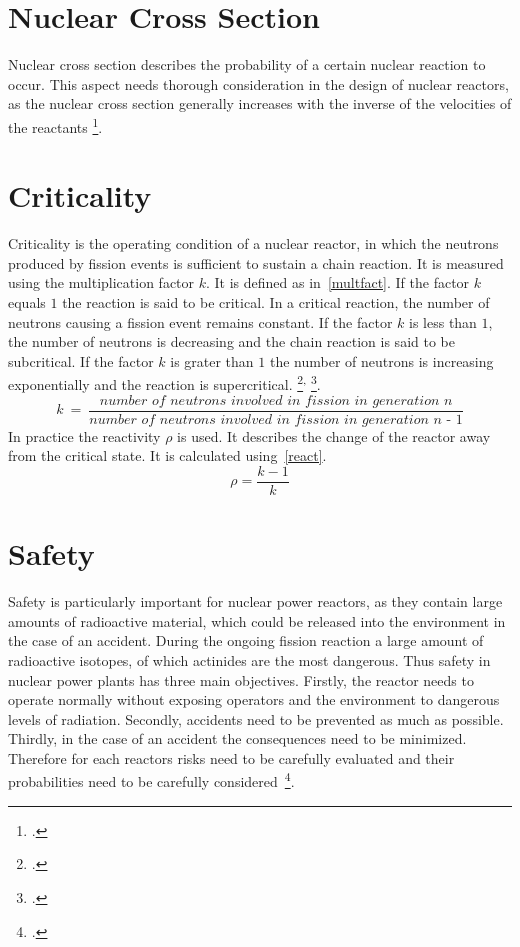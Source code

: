 \section{Nuclear Cross Section}
Nuclear cross section describes the probability of a certain nuclear reaction to occur. This
aspect needs thorough consideration in the design of nuclear reactors, as the nuclear cross section
generally increases with the inverse of the velocities of the reactants \footcite[108]{nucfundamentals}.

\section{Criticality}
Criticality is the operating condition of a nuclear reactor, in which the neutrons produced by fission
events is sufficient to sustain a chain reaction. It is measured using the multiplication factor
$k$. It is defined as in~\ref{multfact}. If the factor $k$ equals $1$ the reaction is said to be
critical. In a critical reaction, the number of neutrons causing a fission event remains constant. 
If the factor $k$ is less than $1$, the number of neutrons is decreasing and the chain reaction is said to be subcritical. If the factor
$k$ is grater than $1$ the number of neutrons is increasing exponentially and the reaction is supercritical.
\footcite[308]{nucfundamentals}\textsuperscript{,} \footcite[39]{ReactorPhysics}.
\begin{equation}
    \label{multfact}
    k~=~\frac{\textit{number of neutrons involved in fission in generation n}}{\textit{number of neutrons involved in fission in generation n - 1}}
\end{equation}
In practice the reactivity $\rho$ is used. It describes the change of the reactor away from the critical
state. It is calculated using~\ref{react}.
\begin{equation}
    \label{react}
    \rho = \frac{k-1}{k}
\end{equation}

\section{Safety}
Safety is particularly important for nuclear power reactors, as they contain large amounts of radioactive
material, which could be released into the environment in the case of an accident. During the ongoing
fission reaction a large amount of radioactive isotopes, of which actinides are the most dangerous.
Thus safety in nuclear power plants has three main objectives. Firstly, the reactor needs to operate normally
without exposing operators and the environment to dangerous levels of radiation. Secondly, accidents need
to be prevented as much as possible. Thirdly, in the case of an accident the consequences need to be minimized.
Therefore for each reactors risks need to be carefully evaluated and their probabilities need to be
carefully considered~\footcite[793]{engHandbook}.

